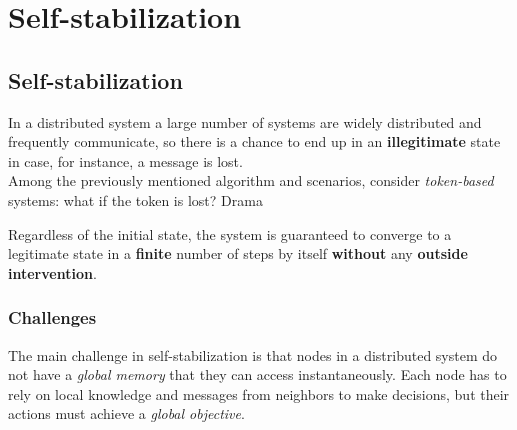 \chapter{Self-stabilization}

\section{Self-stabilization}
In a distributed system a large number of systems are widely distributed and frequently communicate, so there is a chance to end up in an \textbf{illegitimate} state in case, for instance, a message is lost.\\
Among the previously mentioned algorithm and scenarios, consider \textit{token-based} systems: what if the token is lost? Drama \frownie



\begin{definition}
   Regardless of the initial state, the system is guaranteed to converge to a legitimate state in a \textbf{finite} number of steps by itself \textbf{without} any \textbf{outside intervention}.
\end{definition}

\subsection{Challenges}
The main challenge in self-stabilization is that nodes in a distributed system do not have a \textit{global memory} that they can access instantaneously.
Each node has to rely on local knowledge and messages from neighbors to make decisions, but their actions must achieve a \textit{global objective}.

